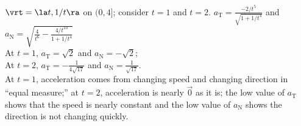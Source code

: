 {$\vrt = \la t,1/t \ra$ on $(0,4]$; consider $t=1$ and $t=2$.
}
{$a_{\text{T}} = \frac{-2/t^5}{\sqrt{1+1/t^4}}$ and $a_{\text{N}} = \sqrt{\frac{4}{t^6}-\frac{4/t^{10}}{1+1/t^4}}$\\
At $t=1$, $a_{\text{T}} = \sqrt{2}$ and $a_{\text{N}} = -\sqrt{2}$;\\
At $t=2$, $a_{\text{T}} = -\frac{1}{4\sqrt{17}}$ and $a_{\text{N}} = \frac{1}{\sqrt{17}}$.\\
At $t=1$, acceleration comes from changing speed and changing direction in ``equal measure;'' at $t=2$, acceleration is nearly $\vec 0$ as it is; the low value of $a_{\text{T}}$ shows that the speed is nearly constant and the low value of $a_{\text{N}}$ shows the direction is not changing quickly.
}